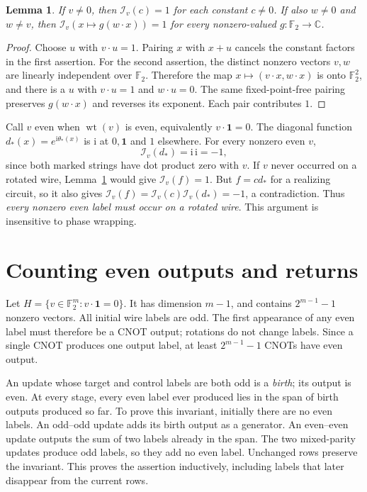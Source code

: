 \documentclass[11pt]{article}
\newtheorem{lemma}{Lemma}
\newcommand{\F}{\mathbb F_2}
\newcommand{\wt}{\operatorname{wt}}
\begin{document}
\begin{lemma}\label{lem:character}
If $v\ne0$, then $\mathcal I_v(c)=1$ for each constant $c\ne0$.
If also $w\ne0$ and $w\ne v$, then
$\mathcal I_v(x\mapsto g(w\cdot x))=1$ for every nonzero-valued
$g:\F\to\mathbb C$.
\end{lemma}
\begin{proof}
Choose $u$ with $v\cdot u=1$. Pairing $x$ with $x+u$ cancels the
constant factors in the first assertion. For the second assertion,
the distinct nonzero vectors $v,w$ are linearly independent over $\F$.
Therefore the map $x\mapsto(v\cdot x,w\cdot x)$ is onto $\F^2$,
and there is a $u$ with $v\cdot u=1$ and $w\cdot u=0$.
The same fixed-point-free pairing preserves $g(w\cdot x)$ and reverses
its exponent. Each pair contributes $1$.
\end{proof}

Call $v$ even when $\wt(v)$ is even, equivalently $v\cdot\mathbf1=0$.
The diagonal function $d_*(x)=e^{\mathrm i\theta_*(x)}$ is $\mathrm i$
at $0,\mathbf1$ and $1$ elsewhere. For every nonzero even $v$,
\[
 \mathcal I_v(d_*)=\mathrm i\,\mathrm i=-1,
\]
since both marked strings have dot product zero with $v$.
If $v$ never occurred on a rotated wire, Lemma~\ref{lem:character}
would give $\mathcal I_v(f)=1$. But $f=cd_*$ for a realizing circuit,
so it also gives $\mathcal I_v(f)=\mathcal I_v(c)\mathcal I_v(d_*)=-1$,
a contradiction. Thus \emph{every nonzero even label must occur on a
rotated wire}. This argument is insensitive to phase wrapping.

\section{Counting even outputs and returns}
Let $H=\{v\in\F^m:v\cdot\mathbf1=0\}$. It has dimension $m-1$,
and contains $2^{m-1}-1$ nonzero vectors. All initial wire labels are
odd. The first appearance of any even label must therefore be a CNOT
output; rotations do not change labels. Since a single CNOT produces
one output label, at least $2^{m-1}-1$ CNOTs have even output.

An update whose target and control labels are both odd is a
\emph{birth}; its output is even. At every stage, every even label ever
produced lies in the span of birth outputs produced so far. To prove
this invariant, initially there are no even labels. An odd--odd update
adds its birth output as a generator. An even--even update outputs the
sum of two labels already in the span. The two mixed-parity updates
produce odd labels, so they add no even label. Unchanged rows preserve
the invariant. This proves the assertion inductively, including labels
that later disappear from the current rows.
\end{document}
